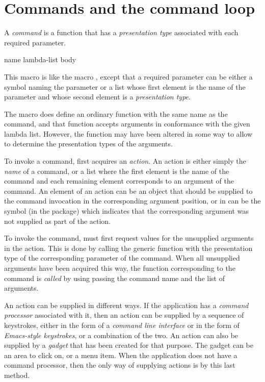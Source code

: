 \chapter{Commands and the command loop}

A \emph{command} is a \cl{} function that has a \emph{presentation
  type} associated with each required parameter.  

 {name lambda-list \body body}

This macro is like the \cl{} macro , except that a
required parameter can be either a symbol naming the parameter or a
list whose first element is the name of the parameter and whose second
element is a \emph{presentation type}.  

The macro  does define an ordinary \cl{} function
with the same name as the command, and that function accepts arguments
in conformance with the given lambda list.  However, the function may
have been altered in some way to allow \clim{} to determine the
presentation types of the arguments. 

To invoke a command, \clim{} first acquires an \emph{action}.  An
action is either simply the \emph{name} of a command, or a list where
the first element is the name of the command and each remaining
element corresponds to an argument of the command.  An element of an
action can be an object that should be supplied to the command
invocation in the corresponding argument position, or in can be the
symbol  (in the  package) which indicates that the
corresponding argument was not supplied as part of the action. 

To invoke the command, \clim{} must first request values for the
unsupplied arguments in the action.  This is done by calling the
generic function  with the presentation type of the
corresponding parameter of the command.  When all unsupplied arguments
have been acquired this way, the \cl{} function corresponding to the
command is \emph{called} by using  passing the command
name and the list of arguments.

An action can be supplied in different ways.  If the application has a
\emph{command processor} associated with it, then an action can be
supplied by a sequence of keystrokes, either in the form of a
\emph{command line interface} or in the form of \emph{Emacs-style
  keystrokes}, or a combination of the two.  An action can also be
supplied by a \emph{gadget} that has been created for that purpose.
The gadget can be an area to click on, or a menu item.   When the
application does not have a command processor, then the only way of
supplying actions is by this last method. 

